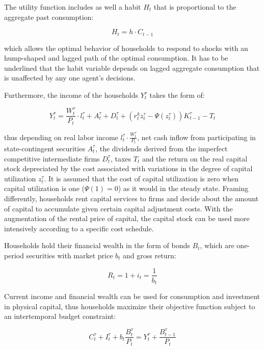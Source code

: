 \documentclass{pracamgr}
\numberwithin{equation}{section}
\begin{document}
The utility function includes as well a habit $H_{t}$ that is proportional to the aggregate past consumption:

\begin{equation}
H_{t} = h \cdot C_{t-1}
\end{equation}

which allows the optimal behavior of households to respond to shocks with an hump-shaped and lagged path of the optimal consumption. It has to be underlined that the habit variable depends on lagged aggregate consumption that is unaffected by any one agent's decisions.

Furthermore, the income of the households $Y_{t}^{\tau}$ takes the form of:

\begin{equation}
Y_{t}^{\tau} = \frac{W_{t}^{\tau}}{P_{t}} \cdot l_{t}^{\tau} + A_{t}^{\tau} + D_{t}^{\tau} + \left( r_{t}^{k} z_{t}^{\tau} - \Psi(z_{t}^{\tau}) \right) K_{t-1}^{\tau} - T_{t}
\end{equation}

thus depending on real labor income $l_{t}^{\tau} \cdot \frac{W_{t}^{\tau}}{P_{t}} $, net cash inflow from participating in state-contingent securities $A_{t}^{\tau}$, the dividends derived from the imperfect competitive intermediate firms $D_{t}^{\tau}$, taxes $T_{t}$ and the return on the real capital stock depreciated by the cost associated with variations in the degree of capital utilization $z_{t}^{\tau}$. It is assumed that the cost of capital utilization is zero when capital utilization is one ($\Psi(1) = 0$) as it would in the steady state. Framing differently, households rent capital services to firms and decide about the amount of capital to accumulate given certain capital adjustment costs. With the augmentation of the rental price of capital, the capital stock can be used more intensively according to a specific cost schedule.

Households hold their financial wealth in the form of bonds $B_{t}$, which are one-period securities with market price $b_{t}$ and gross return:

\begin{equation}
R_{t} = 1 + i_{t}= \frac{1}{b_{t}}
\end{equation}

Current income and financial wealth can be used for consumption and investment in physical capital, thus households maximize their objective function subject to an intertemporal budget constraint:

\begin{equation}
C_{t}^{\tau} + I_{t}^{\tau} + b_{t} \frac{B_{t}^{\tau}}{P_{t}} = Y_{t}^{\tau} + \frac{B_{t-1}^{\tau}}{P_{t}}
\end{equation}
\end{document}

